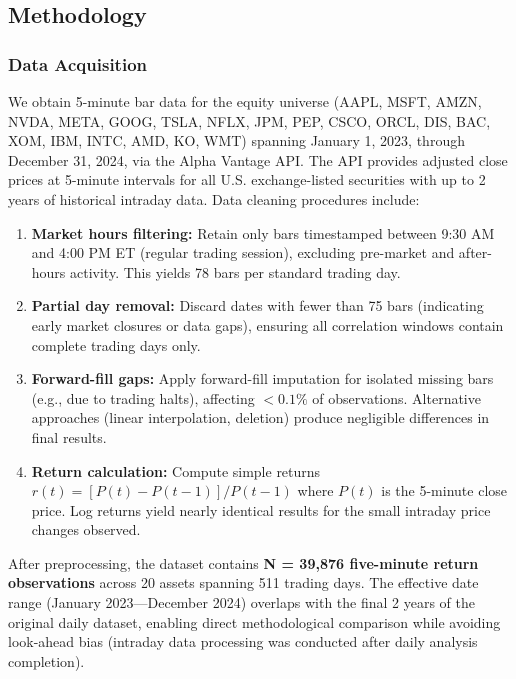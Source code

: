 \subsection{Methodology}

\subsubsection{Data Acquisition}

We obtain 5-minute bar data for the equity universe (AAPL, MSFT, AMZN, NVDA, META, GOOG, TSLA, NFLX, JPM, PEP, CSCO, ORCL, DIS, BAC, XOM, IBM, INTC, AMD, KO, WMT) spanning January 1, 2023, through December 31, 2024, via the Alpha Vantage API. The API provides adjusted close prices at 5-minute intervals for all U.S. exchange-listed securities with up to 2 years of historical intraday data. Data cleaning procedures include:

\begin{enumerate}
\item \textbf{Market hours filtering:} Retain only bars timestamped between 9:30 AM and 4:00 PM ET (regular trading session), excluding pre-market and after-hours activity. This yields 78 bars per standard trading day.

\item \textbf{Partial day removal:} Discard dates with fewer than 75 bars (indicating early market closures or data gaps), ensuring all correlation windows contain complete trading days only.

\item \textbf{Forward-fill gaps:} Apply forward-fill imputation for isolated missing bars (e.g., due to trading halts), affecting $<0.1\%$ of observations. Alternative approaches (linear interpolation, deletion) produce negligible differences in final results.

\item \textbf{Return calculation:} Compute simple returns $r(t) = [P(t) - P(t-1)] / P(t-1)$ where $P(t)$ is the 5-minute close price. Log returns yield nearly identical results for the small intraday price changes observed.
\end{enumerate}

After preprocessing, the dataset contains \textbf{N = 39,876 five-minute return observations} across 20 assets spanning 511 trading days. The effective date range (January 2023---December 2024) overlaps with the final 2 years of the original daily dataset, enabling direct methodological comparison while avoiding look-ahead bias (intraday data processing was conducted after daily analysis completion).

